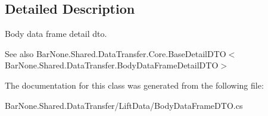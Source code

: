 \subsection{Detailed Description}
Body data frame detail dto. 

\begin{DoxySeeAlso}{See also}
Bar\+None.\+Shared.\+Data\+Transfer.\+Core.\+Base\+Detail\+D\+T\+O$<$\+Bar\+None.\+Shared.\+Data\+Transfer.\+Body\+Data\+Frame\+Detail\+D\+T\+O$>$


\end{DoxySeeAlso}


The documentation for this class was generated from the following file\+:\begin{DoxyCompactItemize}
\item 
Bar\+None.\+Shared.\+Data\+Transfer/\+Lift\+Data/Body\+Data\+Frame\+D\+T\+O.\+cs\end{DoxyCompactItemize}
